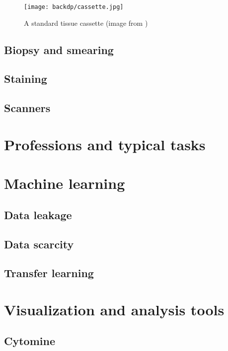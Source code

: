 \begin{figure}
  \centering
  \texttt{[image: backdp/cassette.jpg]}
  \caption{A standard tissue cassette (image from \parencite{stidworthy2011getting})}
  \label{fig:backdp:cassette}
\end{figure}

\subsection{Biopsy and smearing}
\subsection{Staining}
\subsection{Scanners}

\section{Professions and typical tasks}
\label{sec:backdp:professionandtasks}

\section{Machine learning}
\label{sec:backdp:ml}

\subsection{Data leakage}
\label{ssec:backdp:dataleakage}

\subsection{Data scarcity}
\label{ssec:backdp:datascarcity}

\subsection{Transfer learning}
\label{ssec:backdp:tl}

\parencite{van2019strategies}

\section{Visualization and analysis tools}

\subsection{Cytomine}

